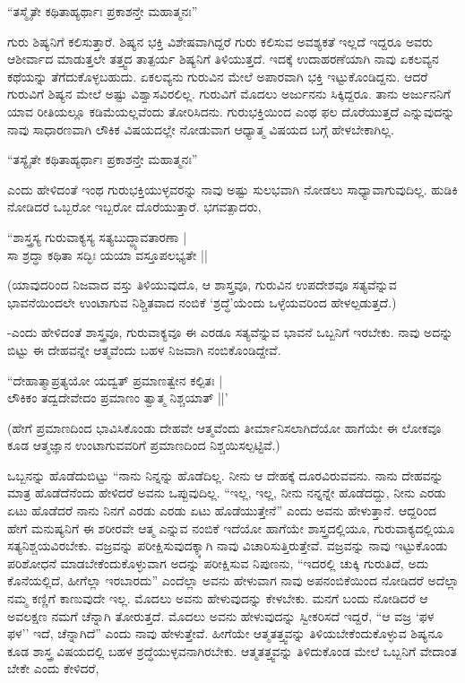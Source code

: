 \begin{shloka}
``ತಸ್ಮೈತೇ ಕಥಿತಾಹ್ಯರ್ಥಾಃ ಪ್ರಕಾಶನ್ತೇ ಮಹಾತ್ಮನಃ''
\end{shloka}

ಗುರು ಶಿಷ್ಯನಿಗೆ ಕಲಿಸುತ್ತಾರೆ. ಶಿಷ್ಯನ ಭಕ್ತಿ ವಿಶೇಷವಾಗಿದ್ದರೆ ಗುರು ಕಲಿಸುವ ಅವಶ್ಯಕತೆ ಇಲ್ಲದೆ ಇದ್ದರೂ ಅವರು ಆಶೀರ್ವಾದ ಮಾಡುತ್ತಲೇ ತತ್ತ್ವದ ತಾತ್ಪರ್ಯ ಶಿಷ್ಯನಿಗೆ ತಿಳಿಯುತ್ತದೆ. ಇದಕ್ಕೆ ಉದಾಹರಣೆಯಾಗಿ ನಾವು ಏಕಲವ್ಯನ ಕಥೆಯನ್ನು ತೆಗೆದುಕೊಳ್ಳಬಹುದು. ಏಕಲವ್ಯನು ಗುರುವಿನ ಮೇಲೆ ಅಪಾರವಾಗಿ ಭಕ್ತಿ ಇಟ್ಟುಕೊಂಡಿದ್ದನು. ಆದರೆ ಗುರುವಿಗೆ ಶಿಷ್ಯನ ಮೇಲೆ ಅಷ್ಟು ವಿಶ್ವಾಸವಿರಲಿಲ್ಲ. ಗುರುವಿಗೆ ಮೊದಲು ಅರ್ಜುನನು ಸಿಕ್ಕಿದ್ದರೂ. ತಾನು ಅರ್ಜುನನಿಗೆ ಯಾವ ರೀತಿಯಲ್ಲೂ ಕಡಿಮೆಯಲ್ಲವೆಂದು ತೋರಿಸಿದನು. ಗುರುಭಕ್ತಿಯಿಂದ ಎಂಥ ಫಲ ದೊರೆಯುತ್ತದೆ ಎನ್ನುವುದನ್ನು ನಾವು ಸಾಧಾರಣವಾಗಿ ಲೌಕಿಕ ವಿಷಯದಲ್ಲೇ ನೋಡುವಾಗ ಆಧ್ಯಾತ್ಮ ವಿಷಯದ ಬಗ್ಗೆ ಹೇಳಬೇಕಾಗಿಲ್ಲ.


\begin{shloka}
``ತಸ್ಯೈತೇ ಕಥಿತಾಹ್ಯರ್ಥಾಃ ಪ್ರಕಾಶನ್ತೇ ಮಹಾತ್ಮನಃ''
\end{shloka}

ಎಂದು ಹೇಳಿದಂತೆ ಇಂಥ ಗುರುಭಕ್ತಿಯುಳ್ಳವರನ್ನು ನಾವು ಅಷ್ಟು ಸುಲಭವಾಗಿ ನೋಡಲು ಸಾಧ್ಯಾವಾಗುವುದಿಲ್ಲ. ಹುಡಿಕಿ ನೋಡಿದರೆ ಒಬ್ಬರೋ ಇಬ್ಬರೋ ದೊರೆಯುತ್ತಾರೆ. ಭಗವತ್ಪಾದರು,

\begin{shloka}
``ಶಾಸ್ತ್ರಸ್ಯ ಗುರುವಾಕ್ಯಸ್ಯ ಸತ್ಯಬುದ್ಧ್ಯಾವತಾರಣಾ |\\
ಸಾ ಶ್ರದ್ಧಾ ಕಥಿತಾ ಸದ್ಭಿಃ ಯಯಾ ವಸ್ತೂಪಲಭ್ಯತೇ ||
\end{shloka}

(ಯಾವುದರಿಂದ ನಿಜವಾದ ವಸ್ತು ತಿಳಿಯುವುದೊ, ಆ ಶಾಸ್ತ್ರವೂ, ಗುರುವಿನ ಉಪದೇಶವೂ ಸತ್ಯವೆನ್ನುವ ಭಾವನೆಯಿಂದಲೇ ಉಂಟಾಗುವ ನಿಶ್ಚಿತವಾದ ನಂಬಿಕೆ `ಶ್ರದ್ಧೆ'ಯೆಂದು ಒಳ್ಳೆಯವರಿಂದ ಹೇಳಲ್ಪಡುತ್ತದೆ.)

-ಎಂದು ಹೇಳಿದಂತೆ ಶಾಸ್ತ್ರವೂ, ಗುರುವಾಕ್ಯವೂ ಈ ಎರಡೂ ಸತ್ಯವೆನ್ನುವ ಭಾವನೆ ಒಬ್ಬನಿಗೆ ಇರಬೇಕು. ನಾವು ಅದನ್ನು ಬಿಟ್ಟು ಈ ದೇಹವನ್ನೇ ಆತ್ಮವೆಂದು ಬಹಳ ನಿಜವಾಗಿ ನಂಬಿಕೊಂಡಿದ್ದೇವೆ.

\begin{shloka}
``ದೇಹಾತ್ಮಾಪ್ರತ್ಯಯೋ ಯದ್ವತ್ ಪ್ರಮಾಣತ್ವೇನ ಕಲ್ಪಿತಃ |\\
ಲೌಕಿಕಂ ತದ್ವದೇವೇದಂ ಪ್ರಮಾಣಂ ತ್ವಾತ್ಮ ನಿಶ್ಚಯಾತ್ ||'
\end{shloka}

(ಹೇಗೆ ಪ್ರಮಾಣದಿಂದ ಭಾವಿಸಿಕೊಂಡು ದೇಹವೇ ಆತ್ಮವೆಂದು ತೀರ್ಮಾನಿಸಲಾಗಿದೆಯೋ ಹಾಗೆಯೇ ಈ ಲೋಕವೂ ಕೂಡ ಆತ್ಮಜ್ಞಾನ ಉಂಟಾಗುವವರಿಗೆ ಪ್ರಮಾಣದಿಂದ ನಿಶ್ಚಯಿಸಲ್ಪಟ್ಟಿವೆ.)

ಒಬ್ಬನನ್ನು ಹೊಡೆದುಬಿಟ್ಟು ``ನಾನು ನಿನ್ನನ್ನು ಹೊಡೆದಿಲ್ಲ. ನೀನು ಆ ದೇಹಕ್ಕೆ ದೂರವಿರುವವನು. ನಾನು ದೇಹವನ್ನು ಮಾತ್ರ ಹೊಡೆದೆನೆಂದು ಹೇಳಿದರೆ ಅವನು ಒಪ್ಪುವುದಿಲ್ಲ. ``ಇಲ್ಲ, ಇಲ್ಲ, ನೀನು ನನ್ನನ್ನೇ ಹೊಡೆದದ್ದು, ನೀನು ಎರಡು ಏಟು ಹೊಡೆದರೆ ನಾನು ನಿನಗೆ ಎರಡು ಎರಡು ಏಟು ಹೊಡೆಯುತ್ತೇನೆ'' ಎಂದು ಅವನು ಹೇಳುತ್ತಾನೆ. ಆದ್ದರಿಂದ ಹೇಗೆ ಮನುಷ್ಯನಿಗೆ ಈ ಶರೀರವೇ ಆತ್ಮ ಎನ್ನುವ ನಂಬಿಕೆ ಇದೆಯೋ ಹಾಗೆಯೇ ಶಾಸ್ತ್ರದಲ್ಲಿಯೂ, ಗುರುವಾಕ್ಯದಲ್ಲಿಯೂ ಸತ್ಯನಿಶ್ಚಯವಿರಬೇಕು. ವಜ್ರವನ್ನು ಪರೀಕ್ಷಿಸುವುದಕ್ಕ್ಕಾಗಿ ನಾವು ವಿಚಾರಿಸುತ್ತಿರುತ್ತೇವೆ. ವಜ್ರವನ್ನು ನಾವು ಇಟ್ಟುಕೊಂಡು ಪರಿಶೋಧನೆ ಮಾಡಬೇಕೆಂದುಕೊಳ್ಳುವಾಗ ಅದನ್ನು ಪರೀಕ್ಷಿಸುವ ನಿಪುಣನು, ``ಇದರಲ್ಲಿ ಚುಕ್ಕಿ ಗುರುತಿದೆ, ಅದು ಕೊನೆಯಲ್ಲಿದೆ, ಹೀಗೆಲ್ಲಾ ಇರಬಾರದು'' ಎಂದೆಲ್ಲಾ ಅವನು ಹೇಳುವಾಗ ನಾವು ಅಪನಂಬಿಕೆಯಿಂದ ನೋಡಿದರೆ ಅದೆಲ್ಲಾ ನಮ್ಮ ಕಣ್ಣಿಗೆ ಕಾಣುವುದೇ ಇಲ್ಲ. ಮೊದಲು ಅವನು ಹೇಳುವುದನ್ನು ಕೇಳಬೇಕು. ಮನಗೆ ಬಂದು ನೋಡಿದರೆ ಆ ಅವಲಕ್ಷಣ ನಮಗೆ ಚೆನ್ನಾಗಿ ತೋರುತ್ತದೆ. ಮೊದಲು ಅವನು ಹೇಳುವುದನ್ನು ಸ್ವೀಕರಿಸದೆ ಇದ್ದರೆ, ``ಆ ವಜ್ರ `ಫಳ ಫಳ'' ಇದೆ, ಚೆನ್ನಾಗಿದೆ'' ಎಂದು ನಾವು ಹೇಳುತ್ತೇವೆ. ಹೀಗೆಯೇ ಆತ್ಮತತ್ತ್ವವನ್ನು ತಿಳಿಯಬೇಕೆಂದುಕೊಳ್ಳುವ ಶಿಷ್ಯನೂ ಕೂಡ ಶಾಸ್ತ್ರ ವಿಷಯದಲ್ಲಿ ಬಹಳ ಶ್ರದ್ಧೆಯುಳ್ಳವನಾಗಿರಬೇಕು. ಆತ್ಮತತ್ತ್ವವನ್ನು ತಿಳಿದುಕೊಂಡ ಮೇಲೆ ಒಬ್ಬನಿಗೆ ವೇದಾಂತ ಬೇಕೇ ಎಂದು ಕೇಳಿದರೆ,

